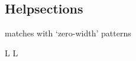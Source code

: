 \subsection{Helpsections}	{}
	{matches with `zero-width'  patterns}


\copyrightnotice


\vfil
\supereject
\if L\lr \else\null\vfill\eject\fi
\if L\lr \else\null\vfill\eject\fi
\bye


